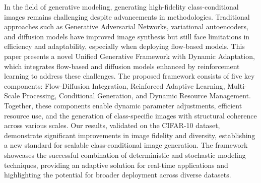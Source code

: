 

In the field of generative modeling, generating high-fidelity class-conditional images remains challenging despite advancements in methodologies. Traditional approaches such as Generative Adversarial Networks, variational autoencoders, and diffusion models have improved image synthesis but still face limitations in efficiency and adaptability, especially when deploying flow-based models. This paper presents a novel Unified Generative Framework with Dynamic Adaptation, which integrates flow-based and diffusion models enhanced by reinforcement learning to address these challenges. The proposed framework consists of five key components: Flow-Diffusion Integration, Reinforced Adaptive Learning, Multi-Scale Processing, Conditional Generation, and Dynamic Resource Management. Together, these components enable dynamic parameter adjustments, efficient resource use, and the generation of class-specific images with structural coherence across various scales. Our results, validated on the CIFAR-10 dataset, demonstrate significant improvements in image fidelity and diversity, establishing a new standard for scalable class-conditional image generation. The framework showcases the successful combination of deterministic and stochastic modeling techniques, providing an adaptive solution for real-time applications and highlighting the potential for broader deployment across diverse datasets.
